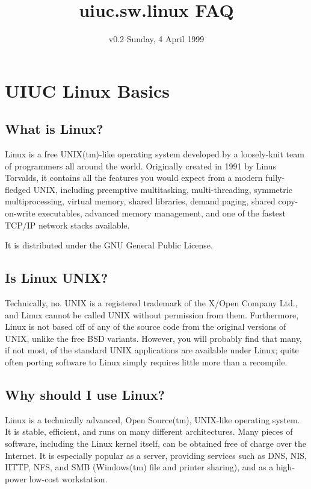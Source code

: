\documentclass[a4paper]{article}
\title{uiuc.sw.linux FAQ}
\author{\onlynameurl{The UIUC Linux Users' Group}}
\date{v0.2 Sunday, 4 April 1999}
\begin{document}
\maketitle
\tableofcontents

\section{UIUC Linux Basics}


\subsection{What is Linux?}

Linux is a free UNIX(tm)-like operating system developed by a loosely-knit
team of programmers all around the world.  Originally created in 1991 by 
Linus Torvalds, it contains all the features you would expect from a
modern fully-fledged UNIX, including preemptive multitasking,
multi-threading, symmetric multiprocessing, virtual memory, shared libraries,
demand paging, shared copy-on-write executables, advanced memory management,
and one of the fastest TCP/IP network stacks available.

It is distributed under the GNU General Public License.




\subsection{Is Linux UNIX?}

Technically, no.  UNIX is a registered trademark of the X/Open Company
Ltd., and Linux cannot be called UNIX without permission from them.
Furthermore, Linux is not based off of any of the source code from the 
original versions of UNIX, unlike the free BSD variants. However, you
will probably find that many, if not most, of the standard UNIX
applications are available under Linux; quite often porting software to
Linux simply requires little more than a recompile.




\subsection{Why should I use Linux?}

Linux is a technically advanced, Open Source(tm), UNIX-like operating
system.  It is stable, efficient, and runs on many different
architectures. Many pieces of software, including the Linux kernel
itself, can be obtained free of  charge over the Internet.  It is
especially popular as a server, providing services such as DNS, NIS,
HTTP, NFS, and SMB (Windows(tm) file and printer sharing), and as a
high-power low-cost workstation.
\end{document}
